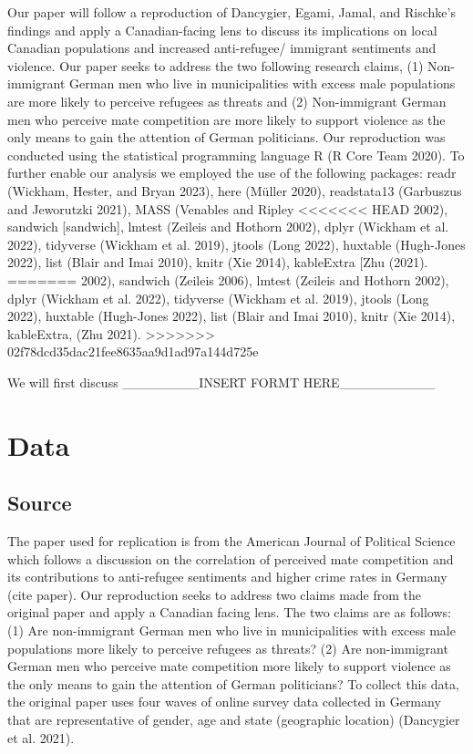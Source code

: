 \documentclass[
]{article}
\begin{document}
Our paper will follow a reproduction of Dancygier, Egami, Jamal, and
Rischke's findings and apply a Canadian-facing lens to discuss its
implications on local Canadian populations and increased anti-refugee/
immigrant sentiments and violence. Our paper seeks to address the two
following research claims, (1) Non-immigrant German men who live in
municipalities with excess male populations are more likely to perceive
refugees as threats and (2) Non-immigrant German men who perceive mate
competition are more likely to support violence as the only means to
gain the attention of German politicians. Our reproduction was conducted
using the statistical programming language R (R Core Team 2020). To
further enable our analysis we employed the use of the following
packages: readr (Wickham, Hester, and Bryan 2023), here (Müller 2020),
readstata13 (Garbuszus and Jeworutzki 2021), MASS (Venables and Ripley
<<<<<<< HEAD
2002), sandwich {[}sandwich{]}, lmtest (Zeileis and Hothorn 2002), dplyr
(Wickham et al. 2022), tidyverse (Wickham et al. 2019), jtools (Long
2022), huxtable (Hugh-Jones 2022), list (Blair and Imai 2010), knitr
(Xie 2014), kableExtra {[}Zhu (2021).
=======
2002), sandwich (Zeileis 2006), lmtest (Zeileis and Hothorn 2002), dplyr
(Wickham et al. 2022), tidyverse (Wickham et al. 2019), jtools (Long
2022), huxtable (Hugh-Jones 2022), list (Blair and Imai 2010), knitr
(Xie 2014), kableExtra, (Zhu 2021).
>>>>>>> 02f78dcd35dac21fee8635aa9d1ad97a144d725e

We will first discuss \_\_\_\_\_\_\_\_INSERT FORMT
HERE\_\_\_\_\_\_\_\_\_\_

\hypertarget{data}{%
\section{Data}\label{data}}

\hypertarget{source}{%
\subsection{Source}\label{source}}

The paper used for replication is from the American Journal of Political
Science which follows a discussion on the correlation of perceived mate
competition and its contributions to anti-refugee sentiments and higher
crime rates in Germany (cite paper). Our reproduction seeks to address
two claims made from the original paper and apply a Canadian facing
lens. The two claims are as follows: (1) Are non-immigrant German men
who live in municipalities with excess male populations more likely to
perceive refugees as threats? (2) Are non-immigrant German men who
perceive mate competition more likely to support violence as the only
means to gain the attention of German politicians? To collect this data,
the original paper uses four waves of online survey data collected in
Germany that are representative of gender, age and state (geographic
location) (Dancygier et al. 2021).
\end{document}
